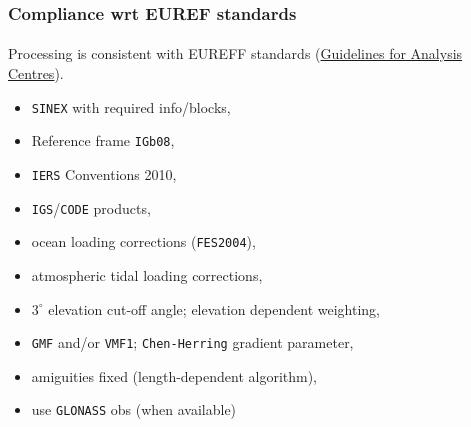 \documentclass{beamer}
\begin{document}
\begin{frame}\frametitle{Compliance wrt EUREF standards}\framesubtitle{}
  Processing is consistent with EUREFF standards (\href{http://www.epncb.oma.be/_documentation/guidelines/guidelines_analysis_centres.pdf}{Guidelines for Analysis Centres}).
  \begin{itemize}%
    \item \texttt{SINEX} with required info/blocks,
    \item Reference frame \texttt{IGb08},
    \item \texttt{IERS} Conventions 2010,
    \item \texttt{IGS}/\texttt{CODE} products,
    \item ocean loading corrections (\texttt{FES2004}),
    \item atmospheric tidal loading corrections,
    \item $3^{\circ}$ elevation cut-off angle; elevation dependent weighting,
    \item \texttt{GMF} and/or \texttt{VMF1}; \texttt{Chen-Herring} gradient parameter,
    \item amiguities fixed (length-dependent algorithm),
    \item use \texttt{GLONASS} obs (when available)
  \end{itemize}
\end{frame}

\end{document}
